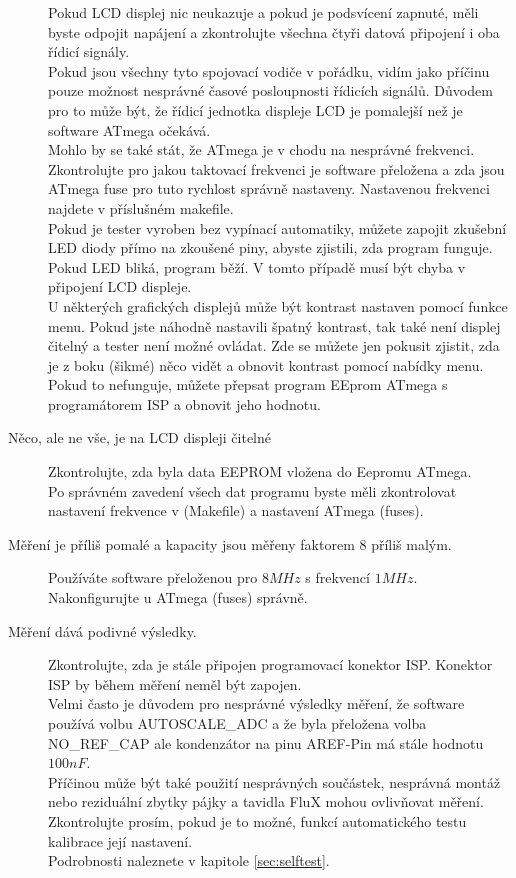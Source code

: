 \begin{description}
Pokud LCD displej nic neukazuje a pokud je podsvícení zapnuté,
měli byste odpojit napájení a zkontrolujte všechna čtyři datová připojení i oba řídicí signály.\\
Pokud jsou všechny tyto spojovací vodiče v pořádku, vidím jako příčinu pouze možnost nesprávné časové posloupnosti řídicích signálů. Důvodem pro to může být, že řídicí jednotka displeje LCD je pomalejší než je software ATmega očekává.\\ Mohlo by se také stát, že ATmega je v chodu na nesprávné frekvenci. Zkontrolujte pro jakou taktovací frekvenci je software přeložena a zda jsou ATmega fuse pro tuto rychlost správně nastaveny.
Nastavenou frekvenci najdete v příslušném makefile.\\
Pokud je tester vyroben bez vypínací automatiky, můžete zapojit zkušební LED diody přímo na
zkoušené piny, abyste zjistili, zda program funguje.
Pokud LED bliká, program běží. V tomto případě musí být chyba v připojení LCD displeje.\\ 
 U některých grafických displejů může být kontrast nastaven pomocí funkce menu.
Pokud jste náhodně nastavili špatný kontrast, tak také není displej čitelný a tester není možné
ovládat.
Zde se můžete jen pokusit zjistit, zda je z boku (šikmé) něco vidět a obnovit kontrast pomocí
nabídky menu. Pokud to nefunguje, můžete přepsat program EEprom ATmega s programátorem ISP a obnovit jeho hodnotu.
\vspace{-0,3 cm}
\item[Něco, ale ne vše, je na LCD displeji čitelné] 
Zkontrolujte, zda byla data EEPROM vložena do Eepromu ATmega.\\
Po správném zavedení všech dat programu byste měli zkontrolovat nastavení frekvence v (Makefile)
a nastavení ATmega (fuses).
\vspace{-0,3 cm}
\item[Měření je příliš pomalé a kapacity jsou měřeny faktorem 8 příliš malým.] 
Používáte software přeloženou pro \(8MHz\) s frekvencí \(1MHz\).\\
Nakonfigurujte u ATmega (fuses) správně.
\vspace{-0,3 cm}
\item[Měření dává podivné výsledky.]  
Zkontrolujte, zda je stále připojen programovací konektor ISP. Konektor ISP by během měření neměl být zapojen.
\\Velmi často je důvodem pro nesprávné výsledky měření, že software používá volbu
 AUTOSCALE\_ADC a že byla přeložena volba NO\_REF\_CAP ale kondenzátor na pinu AREF-Pin má stále
hodnotu \(100nF\).\\
Příčinou může být také použití nesprávných součástek, nesprávná montáž nebo reziduální zbytky pájky a tavidla FluX mohou ovlivňovat měření.
\\Zkontrolujte prosím, pokud je to možné, funkcí automatického testu kalibrace její nastavení.\\
Podrobnosti naleznete v kapitole \ref{sec:selftest}.


\end{description}
